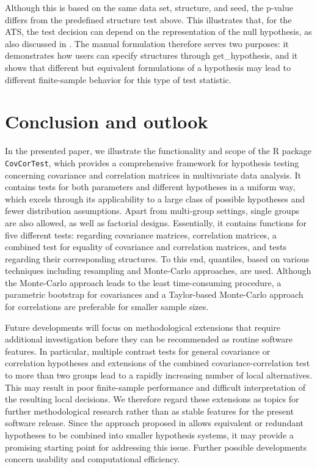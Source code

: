 Although this is based on the same data set, structure, and seed, the p-value
differs from the predefined structure test above. This illustrates that, for the
ATS, the test decision can depend on the representation of the null hypothesis,
as also discussed in \citet{sattler2023a}. The manual formulation therefore
serves two purposes: it demonstrates how users can specify structures through
get\_hypothesis, and it shows that different but equivalent formulations of a
hypothesis may lead to different finite-sample behavior for this type of test
statistic.

\section{Conclusion and outlook}\label{conclusion-and-outlook}

In the presented paper, we illustrate the functionality and scope of the
R package \texttt{CovCorTest}, which provides a comprehensive framework for
hypothesis testing concerning covariance and correlation matrices in
multivariate data analysis. It contains tests for both parameters and different
hypotheses in a uniform way, which excels through its applicability to a large
class of possible hypotheses and fewer distribution assumptions. Apart from
multi-group settings, single groups are also allowed, as well as factorial
designs. Essentially, it contains functions for five different tests: regarding
covariance matrices, correlation matrices, a combined test for equality of
covariance and correlation matrices, and tests regarding their corresponding
structures. To this end, quantiles, based on various techniques including
resampling and Monte-Carlo approaches, are used. Although the Monte-Carlo
approach leads to the least time-consuming procedure, a parametric bootstrap
for covariances and a Taylor-based Monte-Carlo approach for correlations are
preferable for smaller sample sizes.

Future developments will focus on methodological extensions that require
additional investigation before they can be recommended as routine software
features. In particular, multiple contrast tests for general covariance or
correlation hypotheses and extensions of the combined covariance-correlation
test to more than two groups lead to a rapidly increasing number of local
alternatives. This may result in poor finite-sample performance and difficult
interpretation of the resulting local decisions. We therefore regard these
extensions as topics for further methodological research rather than as stable
features for the present software release. Since the approach proposed in
\citet{sattler2026} allows equivalent or redundant hypotheses to be combined
into smaller hypothesis systems, it may provide a promising starting point for
addressing this issue. Further possible developments concern usability and
computational efficiency.


